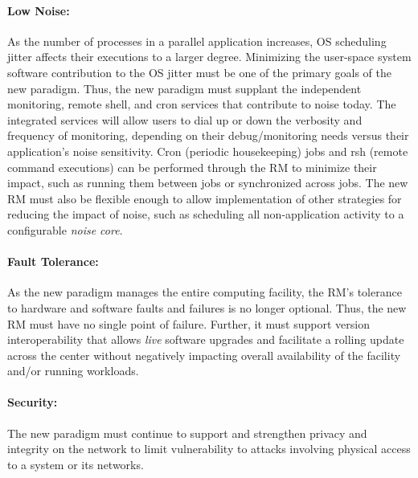 \documentclass{article}
\newcommand{\ngrm}{NGRM}
\begin{document}
\paragraph{Low Noise:}
As the number of processes in a parallel application increases, 
OS scheduling jitter affects their executions to a larger degree.
Minimizing
the user-space system software contribution to the OS jitter must be one 
of the primary goals of the new paradigm.  Thus, the new paradigm must supplant
the independent monitoring, remote shell, and cron
services that contribute to noise today. The integrated services will
allow users to dial up or down the verbosity and frequency of monitoring,
depending on their debug/monitoring needs versus their application's noise
sensitivity. Cron (periodic housekeeping) jobs and rsh (remote command
executions) can be performed through the RM to minimize their impact,
such as running them between jobs or synchronized across jobs. 
The new RM must also be flexible enough to allow implementation of other
strategies for reducing the impact of noise, such as scheduling all
non-application activity to a configurable {\em noise core}.


\paragraph{Fault Tolerance:}
As the new paradigm manages the entire computing facility,
the RM's tolerance to hardware and software faults and failures
is no longer optional.
Thus, the new RM must have no single point of failure. Further, it must support
version interoperability that allows {\em live} software upgrades
and facilitate a rolling update across the center
without negatively impacting overall availability of 
the facility and/or running workloads.


\paragraph{Security:}
The new paradigm must continue to support and strengthen privacy 
and integrity on
the network to limit vulnerability to attacks involving physical access
to a system or its networks.

%
\end{document}
